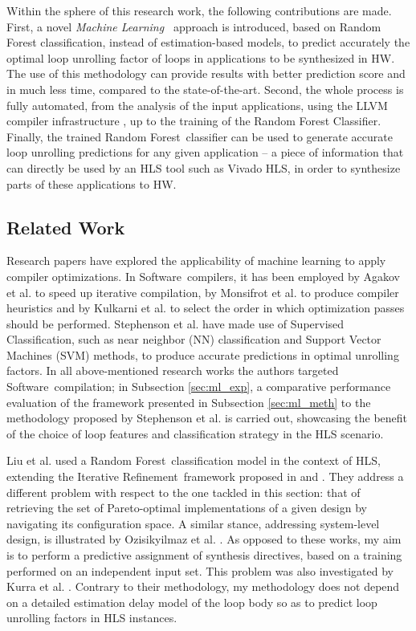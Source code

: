 \documentclass[]{usiinfthesis}
\newcommand{\SW}{{Software}}
\newcommand{\SoTA}{{state-of-the-art}}
\newcommand{\ML}{{Machine Learning}}
\newcommand{\RF}{{Random Forest}}
\newcommand{\ItRef}{{Iterative Refinement}}
\begin{document}
Within the sphere of this research work, the following contributions are made.
First, a novel {\em \ML\ }
approach is introduced, based on Random Forest classification, 
instead of estimation-based models, to predict 
accurately the optimal loop unrolling factor of loops in applications to be synthesized
in HW. The use of this methodology can provide results with better prediction score
and in much less time, compared to the \SoTA.
Second, the whole process is fully automated, from the analysis of the input applications, 
using the LLVM compiler infrastructure \cite{LattnerMar04}, up to the training of the Random 
Forest Classifier. Finally, the trained \RF\ classifier can be used to generate accurate loop 
unrolling predictions for any given application -- a piece of information that can 
directly be used by an HLS tool such as Vivado HLS, in order to synthesize parts of these 
applications to HW.

\subsection{Related Work}

Research papers have explored the applicability of machine learning to apply
compiler optimizations. In \SW\ compilers, it has been
employed by Agakov et al. \cite{AgakovMar06} to speed up iterative compilation,
by Monsifrot et al. \cite{MonsifrotAug02} to produce compiler heuristics
and by Kulkarni et al. \cite{KulkarniOct12} to select the order in which optimization passes
should be performed. Stephenson et al. \cite{StephensonApr05} have made use of Supervised 
Classification, such as near neighbor (NN) classification 
and Support Vector Machines (SVM) methods, to produce accurate predictions in optimal unrolling 
factors.
In all above-mentioned research works the authors targeted \SW\ 
compilation; in Subsection \ref{sec:ml_exp}, a comparative performance evaluation of the 
framework presented in Subsection \ref{sec:ml_meth} to the methodology proposed by 
Stephenson et al. is carried out, showcasing the benefit of the choice of loop features and 
classification strategy in the HLS scenario.\par

Liu et al.  \cite{LiuJun13} used a \RF\
classification model in the context of HLS, extending the \ItRef\
framework proposed in \cite{MarianiApr12} \cite{PalermoNov09}
\cite{XydisMar13} and \cite{ZuluagaJun12}. They address a different
problem with respect to the one tackled in this section: that of retrieving the set of
Pareto-optimal implementations of a given design by navigating its
configuration space. A similar stance, addressing system-level design,
is illustrated by Ozisikyilmaz et al. \cite{OzisikyilmazJun08}.  As
opposed to these works, my aim is to perform a predictive assignment
of synthesis directives, based on a training performed on an independent
input set. This problem was also investigated by Kurra et
al. \cite{KurraApr07}. Contrary to their methodology, my methodology does not
depend on a detailed estimation delay model of the loop body so as to
predict loop unrolling factors in HLS instances.
\end{document}
